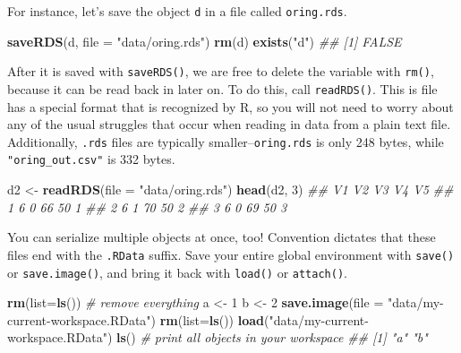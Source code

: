 \documentclass[12pt,krantz2]{krantz}
\makeatletter
\newenvironment{Shaded}{\begin{snugshade}}{\end{snugshade}}
\newcommand{\CommentTok}[1]{\textcolor[rgb]{0.37,0.37,0.37}{\textit{#1}}}
\newcommand{\DataTypeTok}[1]{\textcolor[rgb]{0.27,0.27,0.27}{#1}}
\newcommand{\DecValTok}[1]{\textcolor[rgb]{0.06,0.06,0.06}{#1}}
\newcommand{\KeywordTok}[1]{\textcolor[rgb]{0.27,0.27,0.27}{\textbf{#1}}}
\newcommand{\NormalTok}[1]{#1}
\newcommand{\StringTok}[1]{\textcolor[rgb]{0.5,0.5,0.5}{#1}}
\newenvironment{kframe}{%
\medskip{}
\setlength{\fboxsep}{.8em}
 \def\at@end@of@kframe{}%
 \ifinner\ifhmode%
  \def\at@end@of@kframe{\end{minipage}}%
  \begin{minipage}{\columnwidth}%
 \fi\fi%
 \def\FrameCommand##1{\hskip\@totalleftmargin \hskip-\fboxsep
 \colorbox{shadecolor}{##1}\hskip-\fboxsep
     \hskip-\linewidth \hskip-\@totalleftmargin \hskip\columnwidth}%
 \MakeFramed {\advance\hsize-\width
   \@totalleftmargin\z@ \linewidth\hsize
   \@setminipage}}%
 {\par\unskip\endMakeFramed%
 \at@end@of@kframe}
\renewenvironment{Shaded}{\begin{kframe}}{\end{kframe}}
\makeatother
\begin{document}
For instance, let's save the object \texttt{d} in a file called \texttt{oring.rds}.

\begin{Shaded}
\begin{Highlighting}[]
\KeywordTok{saveRDS}\NormalTok{(d, }\DataTypeTok{file =} \StringTok{"data/oring.rds"}\NormalTok{)}
\KeywordTok{rm}\NormalTok{(d)}
\KeywordTok{exists}\NormalTok{(}\StringTok{"d"}\NormalTok{)}
\CommentTok{## [1] FALSE}
\end{Highlighting}
\end{Shaded}

After it is saved with \texttt{saveRDS()}, we are free to delete the variable with \texttt{rm()}, because it can be read back in later on. To do this, call \texttt{readRDS()}. This is file has a special format that is recognized by R, so you will not need to worry about any of the usual struggles that occur when reading in data from a plain text file. Additionally, \texttt{.rds} files are typically smaller--\texttt{oring.rds} is only 248 bytes, while \texttt{"oring\_out.csv"} is 332 bytes.

\begin{Shaded}
\begin{Highlighting}[]
\NormalTok{d2 <-}\StringTok{ }\KeywordTok{readRDS}\NormalTok{(}\DataTypeTok{file =} \StringTok{"data/oring.rds"}\NormalTok{)}
\KeywordTok{head}\NormalTok{(d2, }\DecValTok{3}\NormalTok{)}
\CommentTok{##   V1 V2 V3 V4 V5}
\CommentTok{## 1  6  0 66 50  1}
\CommentTok{## 2  6  1 70 50  2}
\CommentTok{## 3  6  0 69 50  3}
\end{Highlighting}
\end{Shaded}

You can serialize multiple objects at once, too! Convention dictates that these files end with the \texttt{.RData} suffix. Save your entire global environment with \texttt{save()} or \texttt{save.image()}, and bring it back with \texttt{load()} or \texttt{attach()}.

\begin{Shaded}
\begin{Highlighting}[]
\KeywordTok{rm}\NormalTok{(}\DataTypeTok{list=}\KeywordTok{ls}\NormalTok{()) }\CommentTok{# remove everything}
\NormalTok{a <-}\StringTok{ }\DecValTok{1}
\NormalTok{b <-}\StringTok{ }\DecValTok{2}
\KeywordTok{save.image}\NormalTok{(}\DataTypeTok{file =} \StringTok{"data/my-current-workspace.RData"}\NormalTok{)}
\KeywordTok{rm}\NormalTok{(}\DataTypeTok{list=}\KeywordTok{ls}\NormalTok{()) }
\KeywordTok{load}\NormalTok{(}\StringTok{"data/my-current-workspace.RData"}\NormalTok{)}
\KeywordTok{ls}\NormalTok{() }\CommentTok{# print all objects in your workspace}
\CommentTok{## [1] "a" "b"}
\end{Highlighting}
\end{Shaded}
\end{document}
